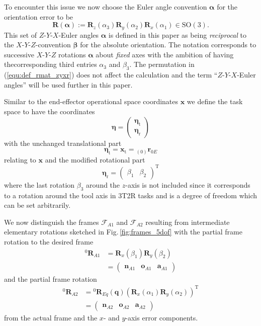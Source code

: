 \documentclass[twocolumn,10pt]{IFTOMM}
\newcommand{\bm}[1]{\boldsymbol{#1}}
\newcommand{\ortvek}[4]{{ }_{(#1)}{\boldsymbol{#2}}^{#3}_{#4} }
\newcommand{\vek}[3]{\boldsymbol{#1}^{#2}_{#3}}
\newcommand{\rotmat}[2]{{{ }^{#1}\boldsymbol{R}}_{#2}}
\newcommand{\transp}[0]{{\mathrm{T}}}
\newcommand{\ks}[1]{{\mathcal{F}}_{#1}}
\begin{document}
To encounter this issue we now choose the Euler angle convention $\bm{\alpha}$ for the orientation error to be 
%
\begin{equation}
\bm{R}(\bm{\alpha}) := \bm{R}_z(\alpha_3) \bm{R}_y(\alpha_2) \bm{R}_x(\alpha_1) \in \mathrm{SO(3)}.
\label{equ:def_rmat_zyxr}
\end{equation}
%
This set of $Z$-$Y$-$X$-Euler angles $\bm{\alpha}$ is defined in this paper as being \emph{reciprocal} to the $X$-$Y$-$Z$-convention $\bm{\beta}$ for the absolute orientation.
The notation corresponds to successive $X$-$Y$-$Z$ rotations $\bm{\alpha}$ about \emph{fixed} axes with the ambition of having thecorresponding third entries $\alpha_3$ and $\beta_3$.
The permutation in (\ref{equ:def_rmat_zyxr}) does not affect the calculation and the term ``$Z$-$Y$-$X$-Euler angles'' will be used further in this paper.

Similar to the end-effector operational space coordinates $\bm{x}$ we define the task space to have the coordinates
%
\begin{equation}
\bm{\eta}
=
\begin{pmatrix}
\bm{\eta}_{\mathrm{t}} \\
\bm{\eta}_{\mathrm{r}}
\end{pmatrix}
\end{equation}  
%
with the unchanged translational part
%
\begin{equation}
\bm{\eta}_{\mathrm{t}}
=
\bm{x}_{\mathrm{t}}
=
\ortvek{0}{r}{}{0E}
\end{equation}  
%
relating to $\bm{x}$ and the modified rotational part
%
\begin{equation}
\bm{\eta}_{\mathrm{r}}
=
\begin{pmatrix}
\beta_1  & \beta_2
\end{pmatrix}^\transp
\end{equation}
%
where the last rotation $\beta_3$ around the $z$-axis is not included since it corresponds to a rotation around the tool axis in 3T2R tasks and is a degree of freedom which can be set arbitrarily.

We now distinguish the frames $\ks{A1}$ and $\ks{A2}$ resulting from intermediate elementary rotations sketched in Fig.\,\ref{fig:frames_5dof} with the partial frame rotation to the desired frame
%
\begin{align}
\rotmat{0}{A1} 
&= 
\bm{R}_x(\beta_1) \bm{R}_y(\beta_2)\\
&=
\begin{pmatrix}
\vek{n}{}{A1} & \vek{o}{}{A1} & \vek{a}{}{A1}
\end{pmatrix} \nonumber
\end{align}
%
and the partial frame rotation
%
\begin{align}
\rotmat{0}{A2} 
&= 
\rotmat{0}{Eq}(\bm{q})
\left(\bm{R}_x(\alpha_1) \bm{R}_y(\alpha_2)\right)^\transp \\ 
&=
\begin{pmatrix}
\vek{n}{}{A2} & \vek{o}{}{A2} & \vek{a}{}{A2}
\end{pmatrix}\nonumber
\end{align}
%
from the actual frame and the $x$- and $y$-axis error components.
\end{document}
